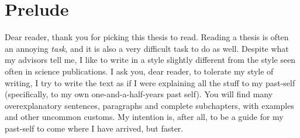 \chapter*{Prelude}\label{prelude}

Dear reader, thank you for picking this thesis to read. Reading a thesis is often an
annoying \emph{task}, and it is also a very difficult task to do as well. Despite what my
advisors tell me, I like to write in a style slightly different from the style seen often
in science publications. I ask you, dear reader, to tolerate my style of writing, I try to
write the text as if I were explaining all the stuff to my past-self (specifically, to my
own one-and-a-half-years past self). You will find many overexplanatory sentences,
paragraphs and complete subchapters, with examples and other uncommon customs. My
intention is, after all, to be a guide for my past-self to come where I have arrived, but
faster.

